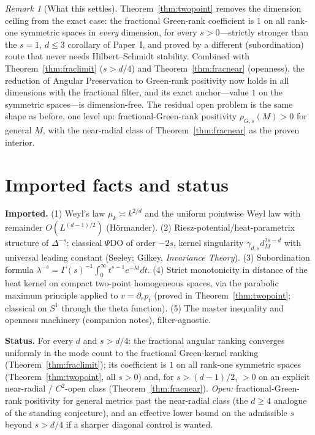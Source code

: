 \documentclass[11pt]{article}
\theoremstyle{remark}
\newtheorem{remark}[theorem]{Remark}
\newcommand{\dM}{d_M}
\begin{document}
\begin{remark}[What this settles]
Theorem~\ref{thm:twopoint} removes the dimension ceiling from the exact case: the fractional
Green-rank coefficient is $1$ on all rank-one symmetric spaces in \emph{every} dimension, for
every $s>0$---strictly stronger than the $s=1$, $d\le3$ corollary of Paper~I, and proved by a
different (subordination) route that never needs Hilbert--Schmidt stability. Combined with
Theorem~\ref{thm:fraclimit} ($s>d/4$) and Theorem~\ref{thm:fracnear} (openness), the reduction
of Angular Preservation to Green-rank positivity now holds in all dimensions with the
fractional filter, and its exact anchor---value $1$ on the symmetric spaces---is dimension-free.
The residual open problem is the same shape as before, one level up: fractional-Green-rank
positivity $\rho_{G,s}(M)>0$ for general $M$, with the near-radial class of
Theorem~\ref{thm:fracnear} as the proven interior.
\end{remark}

\section{Imported facts and status}
\noindent\textbf{Imported.} (1) Weyl's law $\mu_k\asymp k^{2/d}$ and the uniform pointwise
Weyl law with remainder $O(L^{(d-1)/2})$ (H\"ormander). (2) Riesz-potential/heat-parametrix
structure of $\Delta^{-s}$: classical $\Psi$DO of order $-2s$, kernel singularity
$\gamma_{d,s}\dM^{2s-d}$ with universal leading constant (Seeley; Gilkey, \emph{Invariance
Theory}). (3) Subordination formula $\lambda^{-s}=\Gamma(s)^{-1}\int_0^\infty t^{s-1}e^{-\lambda t}dt$.
(4) Strict monotonicity in distance of the heat kernel on compact two-point homogeneous spaces,
via the parabolic maximum principle applied to $v=\partial_rp_t$ (proved in
Theorem~\ref{thm:twopoint}; classical on $S^1$ through the theta function). (5) The master
inequality and openness machinery (companion notes), filter-agnostic.

\medskip
\noindent\textbf{Status.} For every $d$ and $s>d/4$: the fractional angular ranking converges
uniformly in the mode count to the fractional Green-kernel ranking
(Theorem~\ref{thm:fraclimit}); its coefficient is $1$ on all rank-one symmetric spaces
(Theorem~\ref{thm:twopoint}, all $s>0$) and, for $s>(d-1)/2$, $>0$ on an explicit near-radial / $C^2$-open class
(Theorem~\ref{thm:fracnear}). \emph{Open:} fractional-Green-rank positivity for general
metrics past the near-radial class (the $d\ge4$ analogue of the standing conjecture), and an
effective lower bound on the admissible $s$ beyond $s>d/4$ if a sharper diagonal control is
wanted.
\end{document}
